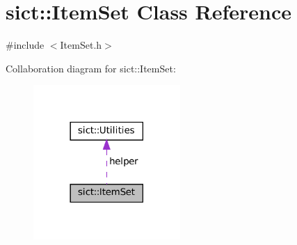 \hypertarget{classsict_1_1ItemSet}{}\section{sict\+::Item\+Set Class Reference}
\label{classsict_1_1ItemSet}


{\ttfamily \#include $<$Item\+Set.\+h$>$}



Collaboration diagram for sict\+::Item\+Set\+:
\nopagebreak
\begin{figure}[H]
\begin{center}
\leavevmode
\includegraphics[width=158pt]{classsict_1_1ItemSet__coll__graph}
\end{center}
\end{figure}
